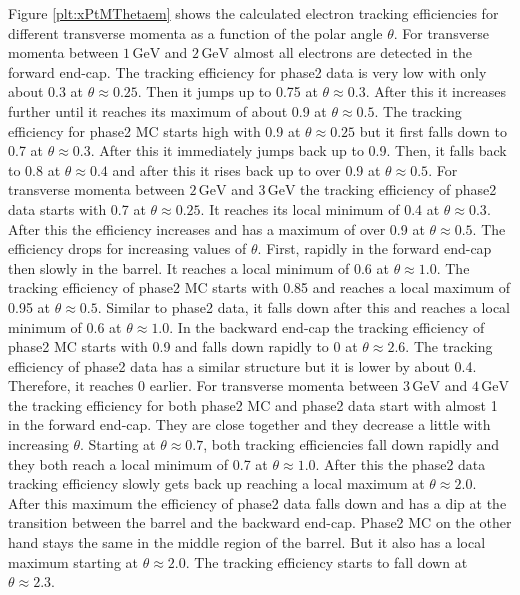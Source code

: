 \documentclass[a4paper,11pt,twosided,final,german,openbib,pdftex,listof=totoc,bibliography=totoc]{scrbook}
\begin{document}
Figure \ref{plt:xPtMThetaem} shows the calculated electron tracking efficiencies for different transverse momenta as a function of the polar angle $\theta$. For transverse momenta between $1\,\textrm{GeV}$ and $2\,\textrm{GeV}$ almost all electrons are detected in the forward end-cap.  The tracking efficiency for phase2 data is very low with only about 0.3 at $\theta \approx 0.25$. Then it jumps up to 0.75 at $\theta \approx 0.3$. After this it increases further until it reaches its maximum of about 0.9 at $\theta \approx 0.5$. The tracking efficiency for phase2 MC starts high with 0.9 at $\theta \approx 0.25$ but it first falls down to 0.7 at $\theta \approx 0.3$. After this it immediately jumps back up to 0.9. Then, it falls back to 0.8 at $\theta \approx 0.4$ and after this it rises back up to over 0.9 at $\theta \approx 0.5$.
For transverse momenta between $2\,\textrm{GeV}$ and $3\,\textrm{GeV}$ the tracking efficiency of phase2 data starts with 0.7 at $\theta \approx 0.25$. It reaches its local minimum of 0.4 at $\theta \approx 0.3$. After this the efficiency increases and has a maximum of over 0.9 at $\theta \approx 0.5$. The efficiency drops for increasing values of $\theta$. First, rapidly in the forward end-cap then slowly in the barrel. It reaches a local minimum of 0.6 at $\theta \approx 1.0$. The tracking efficiency of phase2 MC starts with 0.85 and reaches a local maximum of 0.95 at $\theta \approx 0.5$. Similar to phase2 data, it falls down after this and reaches a local minimum of 0.6 at $\theta \approx 1.0$. In the backward end-cap the tracking efficiency of phase2 MC starts with 0.9 and falls down rapidly to 0 at $\theta \approx 2.6$. The tracking efficiency of phase2 data has a similar structure but it is lower by about 0.4. Therefore, it reaches 0 earlier.
For transverse momenta between $3\,\textrm{GeV}$ and $4\,\textrm{GeV}$ the tracking efficiency for both phase2 MC and phase2 data start with almost 1 in the forward end-cap. They are close together and they decrease a little with increasing $\theta$. Starting at $\theta \approx 0.7$, both tracking efficiencies fall down rapidly and they both reach a local minimum of 0.7 at $\theta \approx 1.0$. After this the phase2 data tracking efficiency slowly gets back up reaching a local maximum at $\theta \approx 2.0$. After this maximum the efficiency of phase2 data falls down and has a dip at the transition between the barrel and the backward end-cap. Phase2 MC on the other hand stays the same in the middle region of the barrel. But it also has a local maximum starting at $\theta \approx 2.0$. The tracking efficiency starts to fall down at $\theta \approx 2.3$.
\end{document}
